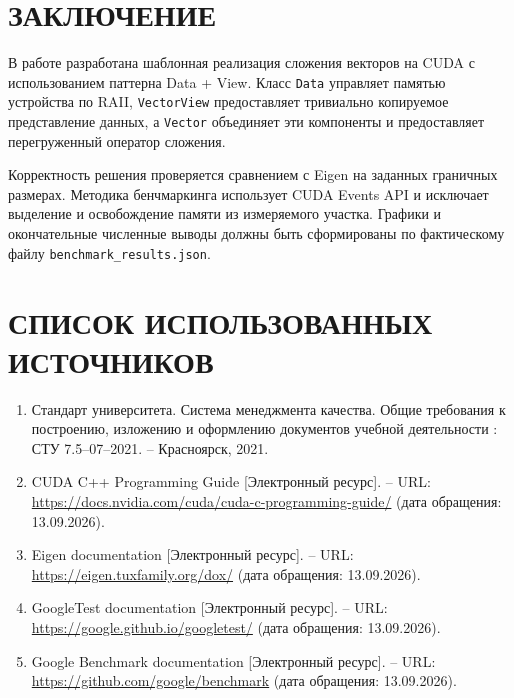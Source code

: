 \documentclass[a4paper,14pt]{article}
\begin{document}
\section*{ЗАКЛЮЧЕНИЕ}
В работе разработана шаблонная реализация сложения векторов на CUDA с использованием паттерна Data + View. Класс \texttt{Data} управляет памятью устройства по RAII, \texttt{VectorView} предоставляет тривиально копируемое представление данных, а \texttt{Vector} объединяет эти компоненты и предоставляет перегруженный оператор сложения.

Корректность решения проверяется сравнением с Eigen на заданных граничных размерах. Методика бенчмаркинга использует CUDA Events API и исключает выделение и освобождение памяти из измеряемого участка. Графики и окончательные численные выводы должны быть сформированы по фактическому файлу \texttt{benchmark\_results.json}.

\section*{СПИСОК ИСПОЛЬЗОВАННЫХ ИСТОЧНИКОВ}
\begin{enumerate}
  \item Стандарт университета. Система менеджмента качества. Общие требования к построению, изложению и оформлению документов учебной деятельности : СТУ 7.5--07--2021. -- Красноярск, 2021.
  \item CUDA C++ Programming Guide [Электронный ресурс]. -- URL: \url{https://docs.nvidia.com/cuda/cuda-c-programming-guide/} (дата обращения: 13.09.2026).
  \item Eigen documentation [Электронный ресурс]. -- URL: \url{https://eigen.tuxfamily.org/dox/} (дата обращения: 13.09.2026).
  \item GoogleTest documentation [Электронный ресурс]. -- URL: \url{https://google.github.io/googletest/} (дата обращения: 13.09.2026).
  \item Google Benchmark documentation [Электронный ресурс]. -- URL: \url{https://github.com/google/benchmark} (дата обращения: 13.09.2026).
\end{enumerate}
\end{document}
